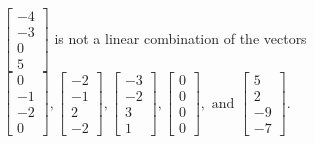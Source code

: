 \begin{exercise}
\begin{exerciseStatement}
  \end{exerciseStatement}
  \begin{exerciseAnswer}
   \(\left[\begin{array}{c}
-4 \\
-3 \\
0 \\
5
\end{array}\right]\) 
  	 is not  
	a linear combination of the vectors \(\left[\begin{array}{c}
0 \\
-1 \\
-2 \\
0
\end{array}\right] , \left[\begin{array}{c}
-2 \\
-1 \\
2 \\
-2
\end{array}\right] , \left[\begin{array}{c}
-3 \\
-2 \\
3 \\
1
\end{array}\right] , \left[\begin{array}{c}
0 \\
0 \\
0 \\
0
\end{array}\right] , \text{ and } \left[\begin{array}{c}
5 \\
2 \\
-9 \\
-7
\end{array}\right]\).

	
  


  \end{exerciseAnswer}
\end{exercise}
